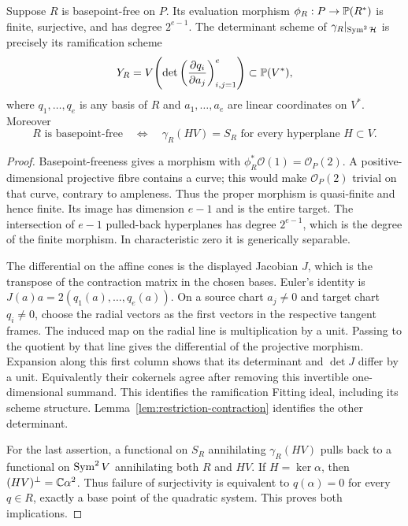 \begin{proposition}
\label{prop:quadratic-ramification}
Suppose $R$ is basepoint-free on $P$. Its evaluation morphism
$\phi_R:P\to\mathbb P(R^*)$ is finite, surjective, and has degree
$2^{e-1}$. The determinant scheme of
$\gamma_R|_{\operatorname{Sym}^2\mathcal H}$ is precisely its ramification scheme
\begin{equation}\label{eq:jacobian-ramification}
 Y_R=V\!\left(\det\left(\frac{\partial q_i}{\partial a_j}\right)_{i,j=1}^e\right)
       \subset\mathbb P(V^*),
\end{equation}
where $q_1,\ldots,q_e$ is any basis of $R$ and $a_1,\ldots,a_e$
are linear coordinates on $V^*$. Moreover
\begin{equation}\label{eq:basepoint-firstorder}
 R\text{ is basepoint-free}
 \quad\Longleftrightarrow\quad
 \gamma_R(HV)=S_R\text{ for every hyperplane }H\subset V.
\end{equation}
\end{proposition}
\begin{proof}
Basepoint-freeness gives a morphism with
$\phi_R^*\mathcal O(1)=\mathcal O_P(2)$. A positive-dimensional
projective fibre contains a curve; this would make $\mathcal O_P(2)$
trivial on that curve, contrary to ampleness. Thus the proper morphism
is quasi-finite and hence finite. Its image has dimension $e-1$ and
is the entire target. The intersection of $e-1$ pulled-back hyperplanes
has degree $2^{e-1}$, which is the degree of the finite morphism.
In characteristic zero it is generically separable.

The differential on the affine cones is the displayed Jacobian $J$,
which is the transpose of the contraction matrix in the chosen bases.
Euler's identity is $J(a)a=2(q_1(a),\ldots,q_e(a))$. On a source chart
$a_j\ne0$ and target chart $q_i\ne0$, choose the radial vectors as the
first vectors in the respective tangent frames. The induced map on
the radial line is multiplication by a unit. Passing to the quotient
by that line gives the differential of the projective morphism.
Expansion along this first column shows that its determinant and
$\det J$ differ by a unit. Equivalently their cokernels agree after
removing this invertible one-dimensional summand. This identifies the
ramification Fitting ideal, including its scheme structure.
Lemma~\ref{lem:restriction-contraction} identifies the other determinant.

For the last assertion, a functional on $S_R$ annihilating
$\gamma_R(HV)$ pulls back to a functional on $\operatorname{Sym}^2V$ annihilating
both $R$ and $HV$. If $H=\ker\alpha$, then
$(HV)^\perp=\mathbb C\alpha^2$. Thus failure of surjectivity is equivalent
to $q(\alpha)=0$ for every $q\in R$, exactly a base point of the
quadratic system. This proves both implications.
\end{proof}

